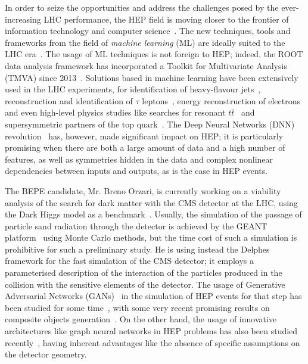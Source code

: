 \documentclass[12pt,a4paper]{sprace}
\begin{document}
In order to seize the opportunities and address the challenges posed by the ever-increasing LHC performance, the HEP field is moving closer to the frontier of information technology and computer science~\cite{Alves:2298968}. The new techniques, tools and frameworks from the field of \emph{machine learning} (ML) are ideally suited to the LHC era~\cite{Radovic2018}. The usage of ML techniques is not foreign to HEP; indeed, the ROOT data analysis framework has incorporated a Toolkit for Multivariate Analysis (TMVA) since 2013~\cite{TMVA}. Solutions based in machine learning have been extensively used in the LHC experiments, for identification of heavy-flavour jets~\cite{Sirunyan:2017ezt}, reconstruction and identification of $\tau$ leptons~\cite{Sirunyan:2018pgf}, energy reconstruction of electrons~\cite{Khachatryan:2015hwa} and even high-level physics studies like searches for resonant $t\overline{t}$~\cite{Sirunyan:2018ryr} and supersymmetric partners of the top quark~\cite{Sirunyan:2018omt}. The Deep Neural Networks (DNN) revolution~\cite{Goodfellow-et-al-2016} has, however, made significant impact on HEP; it is particularly promising when there are both a large amount of data and a high number of features, as well as symmetries hidden in the data and complex nonlinear dependencies between inputs and outputs, as is the case in HEP events.

The BEPE candidate, Mr. Breno Orzari, is currently working on a viability analysis of the search for dark matter with the CMS detector at the LHC, using the Dark Higgs model as a benchmark~\cite{Autran:2015mfa,Duerr:2017uap}. Usually, the simulation of the passage of particle sand radiation through the detector is achieved by the GEANT platform~\cite{agostinelli:2002hh} using Monte Carlo methods, but the time cost of such a simulation is prohibitive for such a preliminary study. He is using instead the Delphes~\cite{defavereau:2013fsa} framework for the fast simulation of the CMS detector; it employs a parameterised description of the interaction of the particles produced in the collision with the sensitive elements of the detector. The usage of Generative Adversarial Networks (GANs)~\cite{NIPS2014_5423} in the simulation of HEP events for that step has been studied for some time~\cite{Paganini:2017dwg}, with some very recent promising results on composite objects generation~\cite{Musella:2018rdi}. On the other hand, the usage of innovative architectures like graph neural networks in HEP problems has also been studied recently~\cite{Qasim:2019otl}, having inherent advantages like the absence of specific assumptions on the detector geometry. 
\end{document}
